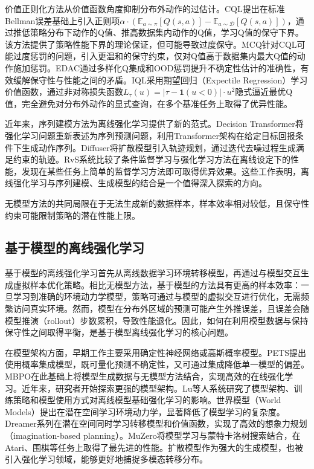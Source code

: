 价值正则化方法从价值函数角度抑制分布外动作的过估计。CQL\cite{Kumar2020CQL}提出在标准Bellman误差基础上引入正则项$\alpha \cdot (\mathbb{E}_{a \sim \pi}[Q(s,a)] - \mathbb{E}_{a \sim \mathcal{D}}[Q(s,a)])$，通过推低策略分布下动作的Q值、推高数据集内动作的Q值，学习Q值的保守下界。该方法提供了策略性能下界的理论保证，但可能导致过度保守。MCQ\cite{Lyu2022MCQ}针对CQL可能过度惩罚的问题，引入更温和的保守约束，仅对Q值高于数据集内最大Q值的动作施加惩罚。EDAC\cite{An2021EDAC}通过多样化Q集成和OOD惩罚提升不确定性估计的准确性，有效缓解保守性与性能之间的矛盾。IQL\cite{Kostrikov2022IQL}采用期望回归（Expectile Regression）学习价值函数，通过非对称损失函数$L_\tau(u) = |\tau - \mathbf{1}(u < 0)| \cdot u^2$隐式逼近最优Q值，完全避免对分布外动作的显式查询，在多个基准任务上取得了优异性能。

近年来，序列建模方法为离线强化学习提供了新的范式。Decision Transformer\cite{Chen2021DecisionTransformer}将强化学习问题重新表述为序列预测问题，利用Transformer架构\cite{Janner2021TT}在给定目标回报条件下生成动作序列。Diffuser\cite{Janner2022Diffuser}将扩散模型引入轨迹规划，通过迭代去噪过程生成满足约束的轨迹。RvS\cite{Emmons2022RvS}系统比较了条件监督学习与强化学习方法在离线设定下的性能，发现在某些任务上简单的监督学习方法即可取得优异效果。这些工作表明，离线强化学习与序列建模、生成模型的结合是一个值得深入探索的方向。

无模型方法的共同局限在于无法生成新的数据样本，样本效率相对较低，且保守性约束可能限制策略的潜在性能上限。


\subsection{基于模型的离线强化学习}\label{Sec1.2.2}

基于模型的离线强化学习首先从离线数据学习环境转移模型，再通过与模型交互生成虚拟样本优化策略\cite{Janner2019MBPO,Yu2020MOPO,Wang2021MORI,Lu2024SER}。相比无模型方法，基于模型的方法具有更高的样本效率：一旦学习到准确的环境动力学模型，策略可通过与模型的虚拟交互进行优化，无需频繁访问真实环境。然而，模型在分布外区域的预测可能产生外推误差\cite{Liu2020Provably}，且误差会随模型推演（rollout）步数累积，导致性能退化。因此，如何在利用模型数据与保持保守性之间取得平衡，是基于模型离线强化学习的核心问题。

在模型架构方面，早期工作主要采用确定性神经网络或高斯概率模型。PETS\cite{Chua2018PETS}提出使用概率集成模型，既可量化预测不确定性，又可通过集成降低单一模型的偏差。MBPO\cite{Janner2019MBPO}在此基础上将模型生成数据与无模型方法结合，实现高效的在线强化学习。近年来，研究者开始探索更强的模型架构。Lu等人\cite{Lu2022MBRL}系统研究了模型架构、训练策略和模型使用方式对离线模型基础强化学习的影响。世界模型（World Models）\cite{Ha2018WorldModels}提出在潜在空间学习环境动力学，显著降低了模型学习的复杂度。Dreamer系列\cite{Hafner2020Dreamer,Hafner2021DreamerV2}在潜在空间同时学习转移模型和价值函数，实现了高效的想象力规划（imagination-based planning）。MuZero\cite{Schrittwieser2020MuZero}将模型学习与蒙特卡洛树搜索结合，在Atari、围棋等任务上取得了最先进的性能。扩散模型作为强大的生成模型，也被引入强化学习领域\cite{Sun2024Conformal,Zhou2024Diffusion}，能够更好地捕捉多模态转移分布。

